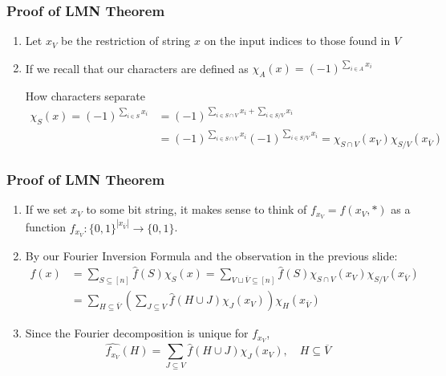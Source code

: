 \documentclass{beamer}
\begin{document}
\begin{frame}
  \frametitle{Proof of LMN Theorem}
  \begin{enumerate}
    \item Let $x_{V}$ be the restriction of string $x$ on the input indices to those found in $V$
    \pause
    \item If we recall that our characters are defined as $\chi_A(x) = (-1)^{\sum_{i \in A} x_i}$
    \pause
    \begin{block}{How characters separate}
      \begin{align*}
        \chi_S(x) = (-1)^{\sum_{i \in S} x_i}
        & = (-1)^{\sum_{i \in S \cap V} x_i + \sum_{i \in S / V} x_i}   \\
        & = (-1)^{\sum_{i \in S \cap V} x_i}(-1)^{\sum_{i \in S / V} x_i} = \chi_{S \cap V}(x_V) \chi_{S / V}(x_{\overline{V}})
      \end{align*}
    \end{block}
  \end{enumerate}
\end{frame}


\begin{frame}
  \frametitle{Proof of LMN Theorem}
  \begin{enumerate}
    \item If we set $x_V$ to some bit string, it makes sense to think of $f_{x_V} = f(x_V,*)$ as a function $f_{x_V}: \{0,1\}^{|x_{\overline{V}}|} \rightarrow \{0,1\}$.
    \pause
    \item By our Fourier Inversion Formula and the observation in the previous slide:
    \begin{align*}
    f(x)
    & = \sum_{S \subseteq [n]} \hat{f}(S)\chi_{S}(x) =  \sum_{V \sqcup \overline{V} \subseteq [n]} \hat{f}(S)\chi_{S \cap V}(x_V)\chi_{S / V}({x_{\overline{V}}}) \\
    & = \sum_{H \subseteq \overline{V}} \left( \sum_{J \subseteq V} \hat{f}(H \cup J) \chi_{J}(x_V) \right) \chi_H(x_{\overline{V}})
  \end{align*}
    \item
    Since the Fourier decomposition is unique for $f_{x_V}$,
    \begin{equation*}
      \widehat{f_{x_V}}(H) = \sum_{J \subseteq V} \hat{f}(H \cup J)\chi_{J}(x_V), \quad H \subseteq \overline{V}
    \end{equation*}
  \end{enumerate}
\end{frame}
\end{document}
